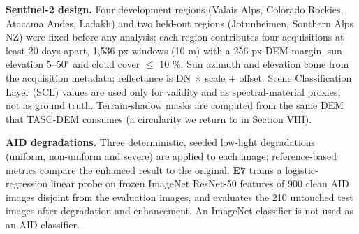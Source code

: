 \documentclass[conference]{IEEEtran}
\begin{document}
\begin{table}[t]
\caption{Datasets and evaluation units.}
\label{tab:datasets}
\centering\scriptsize
\setlength{\tabcolsep}{2.5pt}
\end{table}
\textbf{Sentinel-2 design.} Four development regions (Valais Alps, Colorado Rockies, Atacama Andes, Ladakh) and two held-out regions (Jotunheimen, Southern Alps NZ) were fixed before any analysis; each region contributes four acquisitions at least 20 days apart, 1,536-px windows (10 m) with a 256-px DEM margin, sun elevation 5--50$^{\circ}$ and cloud cover $\leq$ 10 \%. Sun azimuth and elevation come from the acquisition metadata; reflectance is DN $\times$ scale + offset. Scene Classification Layer (SCL) values are used only for validity and as spectral-material proxies, not as ground truth. Terrain-shadow masks are computed from the same DEM that TASC-DEM consumes (a circularity we return to in Section VIII).

\textbf{AID degradations.} Three deterministic, seeded low-light degradations (uniform, non-uniform and severe) are applied to each image; reference-based metrics compare the enhanced result to the original. \textbf{E7} trains a logistic-regression linear probe on frozen ImageNet ResNet-50 features of 900 clean AID images disjoint from the evaluation images, and evaluates the 210 untouched test images after degradation and enhancement. An ImageNet classifier is not used as an AID classifier.
\end{document}
